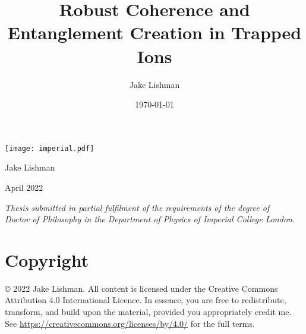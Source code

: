 \documentclass[a4paper,12pt,oneside,british]{scrbook}
\title{Robust Coherence and Entanglement Creation in Trapped Ions}
\author{Jake Lishman}
\date\today
\begin{document}

\makeatletter
\begin{titlepage}\singlespacing%
    {\noindent\texttt{[image: imperial.pdf]}}%
        \begin{center}%
        \vspace*{5.5cm + 2em}%
        \begin{addmargin}[-2em]{-2em}\centering\huge\sffamily\bfseries\@title\end{addmargin}%
        \vspace*{2em + 2.5cm}%
        \Large Jake Lishman\par%
        \vspace{0.5cm}%
        \large April 2022\normalsize\par%
        \vfill%
        {\singlespacing\textit{%
            Thesis submitted in partial fulfilment of the requirements of the degree of\\%
            Doctor of Philosophy in the Department of Physics of Imperial College London.%
        }}%
    \end{center}
\end{titlepage}
\makeatother

\chapter*{Copyright}
\copyright{} 2022 Jake Lishman.
All content is licensed under the Creative Commons Attribution 4.0 International Licence.
In essence, you are free to redistribute, transform, and build upon the material, provided you appropriately credit me.
See \url{https://creativecommons.org/licenses/by/4.0/} for the full terms.
\end{document}
